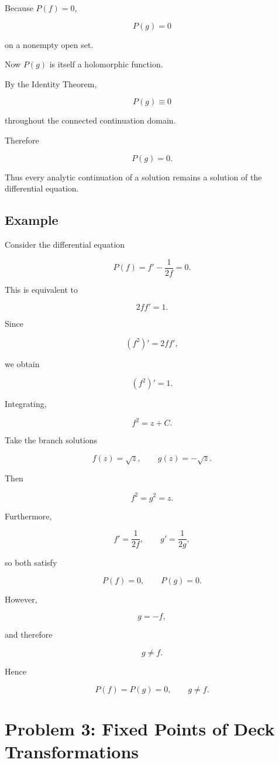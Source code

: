 \documentclass[12pt,a4paper]{article}
\theoremstyle{notespace}
\begin{document}
Because \(P(f)=0\),

\[
P(g)=0
\]

on a nonempty open set.

Now \(P(g)\) is itself a holomorphic function.

By the Identity Theorem,

\[
P(g)\equiv 0
\]

throughout the connected continuation domain.

Therefore

\[
\boxed{P(g)=0.}
\]

Thus every analytic continuation of a solution remains a solution of the differential equation.

\subsection*{Example}

Consider the differential equation

\[
P(f)=f'-\frac{1}{2f}=0.
\]

This is equivalent to

\[
2ff'=1.
\]

Since

\[
(f^2)'=2ff',
\]

we obtain

\[
(f^2)'=1.
\]

Integrating,

\[
f^2=z+C.
\]

Take the branch solutions

\[
f(z)=\sqrt z,
\qquad
g(z)=-\sqrt z.
\]

Then

\[
f^2=g^2=z.
\]

Furthermore,

\[
f'=\frac{1}{2f},
\qquad
g'=\frac{1}{2g},
\]

so both satisfy

\[
P(f)=0,
\qquad
P(g)=0.
\]

However,

\[
g=-f,
\]

and therefore

\[
g\neq f.
\]

Hence

\[
\boxed{
	P(f)=P(g)=0,
	\qquad
	g\neq f.
}
\]

\bigskip

\section{Problem 3: Fixed Points of Deck Transformations}
\end{document}

